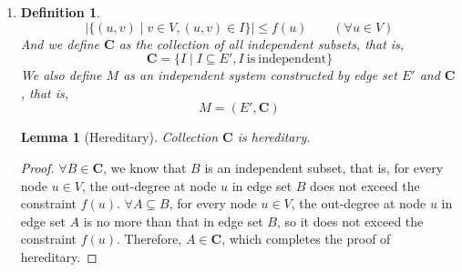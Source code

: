 \documentclass[12pt,a4paper]{article}
\makeatletter
\newtheorem{lemma}[theorem]{Lemma}
\newtheorem*{solution}{Solution}
\newtheorem{definition}{Definition}
\theoremstyle{definition}
\renewenvironment{solution}[1][Solution] {\par\pushQED{\qed}\normalfont\topsep6\p@\@plus6\p@\relax\trivlist\item[\hskip\labelsep\bfseries#1\@addpunct{.}]\ignorespaces}{\popQED\endtrivlist\@endpefalse} \makeatother
\makeatother
\begin{document}
\begin{enumerate}
\begin{solution}
\begin{enumerate}
\begin{definition}
\begin{displaymath}
        \left|\{(u, v) \mid v \in V, (u, v) \in I \}\right| \leq f(u) \quad \quad (\forall u\in V)
        \end{displaymath}
        And we define $\mathbf{C}$ as the collection of all independent subsets, that is,
        \begin{displaymath}
        \mathbf{C} = \{I \mid I \subseteq E', I \mathrm{\ is\ independent}  \}
        \end{displaymath}
        We also define $M$ as an independent system constructed by edge set $E'$ and $\mathbf{C}$, that is,
        \begin{displaymath}
        M = (E', \mathbf{C})
        \end{displaymath}
        \end{definition}
        \begin{lemma}[Hereditary]\label{lemma1}
        Collection $\mathbf{C}$ is hereditary.
        \end{lemma}
        \begin{proof}
        $\forall B \in \mathbf{C}$, we know that $B$ is an independent subset, that is, for every node $u \in V$, the out-degree at node $u$ in edge set $B$ does not exceed the constraint $f(u)$. $\forall A \subseteq B$, for every node $u\in V$, the out-degree at node $u$ in edge set $A$ is no more than that in edge set $B$, so it does not exceed the constraint $f(u)$. Therefore, $A \in \mathbf{C}$, which completes the proof of hereditary.
        \end{proof}


\end{enumerate}
\end{solution}
\end{enumerate}
\end{document}
